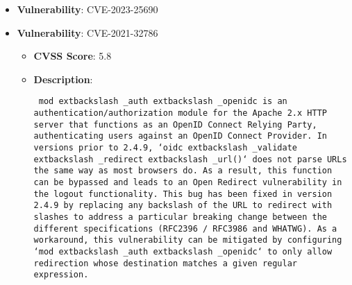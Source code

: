 \documentclass{article}
\begin{document}
\begin{itemize}
        \item \textbf{Vulnerability}: CVE-2023-25690
    
        \item \textbf{Vulnerability}: CVE-2021-32786
        \begin{itemize}
            \item \textbf{CVSS Score}:  5.8 
            \item \textbf{Description}: \parbox{\linewidth}{\texttt{ mod	extbackslash _auth	extbackslash _openidc is an authentication/authorization module for the Apache 2.x HTTP server that functions as an OpenID Connect Relying Party, authenticating users against an OpenID Connect Provider. In versions prior to 2.4.9, `oidc	extbackslash _validate	extbackslash _redirect	extbackslash _url()` does not parse URLs the same way as most browsers do. As a result, this function can be bypassed and leads to an Open Redirect vulnerability in the logout functionality. This bug has been fixed in version 2.4.9 by replacing any backslash of the URL to redirect with slashes to address a particular breaking change between the different specifications (RFC2396 / RFC3986 and WHATWG). As a workaround, this vulnerability can be mitigated by configuring `mod	extbackslash _auth	extbackslash _openidc` to only allow redirection whose destination matches a given regular expression. }}
        \end{itemize}
    

\end{itemize}
\end{document}
